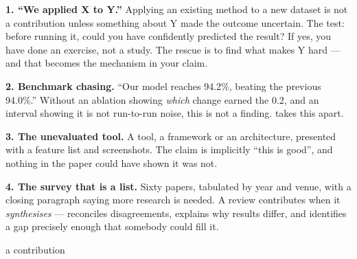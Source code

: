 \begin{pitfall}
\textbf{1. ``We applied X to Y.''} Applying an existing method to a new dataset
is not a contribution unless something about Y made the outcome uncertain. The
test: before running it, could you have confidently predicted the result? If
yes, you have done an exercise, not a study. The rescue is to find what makes Y
hard --- and that becomes the mechanism in your claim.

\medskip
\textbf{2. Benchmark chasing.} ``Our model reaches 94.2\%, beating the previous
94.0\%.'' Without an ablation showing \emph{which} change earned the 0.2, and
an interval showing it is not run-to-run noise, this is not a finding.
 takes this apart.

\medskip
\textbf{3. The unevaluated tool.} A tool, a framework or an architecture,
presented with a feature list and screenshots. The claim is implicitly ``this
is good'', and nothing in the paper could have shown it was not.

\medskip
\textbf{4. The survey that is a list.} Sixty papers, tabulated by year and
venue, with a closing paragraph saying more research is needed. A review
contributes when it \emph{synthesises} --- reconciles disagreements, explains
why results differ, and identifies a gap precisely enough that somebody could
fill it.
\end{pitfall}

\begin{traditions}{a contribution}
\end{traditions}

